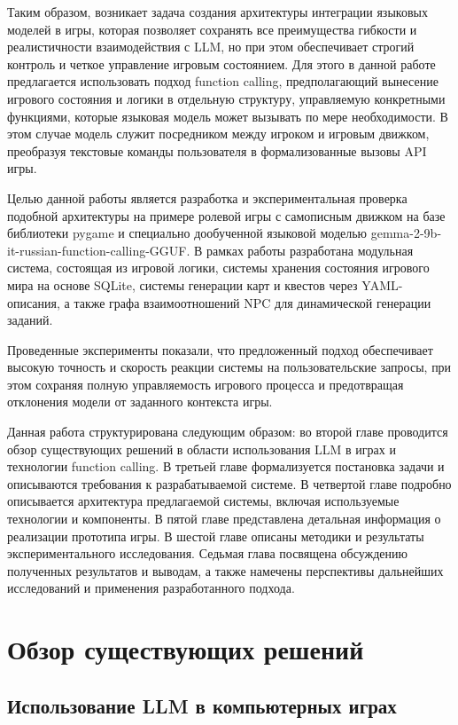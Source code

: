 \documentclass[14pt]{extarticle}
\begin{document}
Таким образом, возникает задача создания архитектуры интеграции языковых моделей в игры, которая позволяет сохранять все преимущества гибкости и реалистичности взаимодействия с LLM, но при этом обеспечивает строгий контроль и четкое управление игровым состоянием. Для этого в данной работе предлагается использовать подход function calling, предполагающий вынесение игрового состояния и логики в отдельную структуру, управляемую конкретными функциями, которые языковая модель может вызывать по мере необходимости. В этом случае модель служит посредником между игроком и игровым движком, преобразуя текстовые команды пользователя в формализованные вызовы API игры.

Целью данной работы является разработка и экспериментальная проверка подобной архитектуры на примере ролевой игры с самописным движком на базе библиотеки pygame и специально дообученной языковой моделью gemma-2-9b-it-russian-function-calling-GGUF. В рамках работы разработана модульная система, состоящая из игровой логики, системы хранения состояния игрового мира на основе SQLite, системы генерации карт и квестов через YAML-описания, а также графа взаимоотношений NPC для динамической генерации заданий.

Проведенные эксперименты показали, что предложенный подход обеспечивает высокую точность и скорость реакции системы на пользовательские запросы, при этом сохраняя полную управляемость игрового процесса и предотвращая отклонения модели от заданного контекста игры.

Данная работа структурирована следующим образом: во второй главе проводится обзор существующих решений в области использования LLM в играх и технологии function calling. В третьей главе формализуется постановка задачи и описываются требования к разрабатываемой системе. В четвертой главе подробно описывается архитектура предлагаемой системы, включая используемые технологии и компоненты. В пятой главе представлена детальная информация о реализации прототипа игры. В шестой главе описаны методики и результаты экспериментального исследования. Седьмая глава посвящена обсуждению полученных результатов и выводам, а также намечены перспективы дальнейших исследований и применения разработанного подхода.

\section{Обзор существующих решений}
\subsection{Использование LLM в компьютерных играх}
\end{document}
